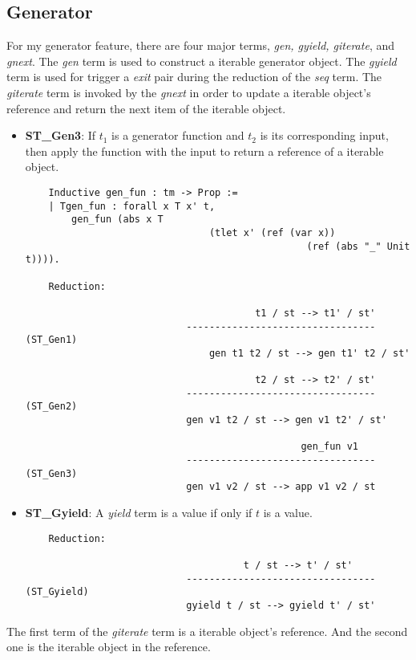 \subsection{Generator}
For my generator feature, there are four major terms, \textit{gen, gyield, giterate}, and \textit{gnext}. The \textit{gen} term is used to construct a iterable generator object. The \textit{gyield} term is used for trigger a \textit{exit} pair during the reduction of the \textit{seq} term. The \textit{giterate} term is invoked by the \textit{gnext} in order to update a iterable object's reference and return the next item of the iterable object.
\begin{itemize}
	\item 
	\textbf{ST_Gen3}: If $t_1$ is a generator function and $t_2$ is its corresponding input, then apply the function with the input to return a reference of a iterable object.
	\begin{lstlisting}
	Inductive gen_fun : tm -> Prop :=
	| Tgen_fun : forall x T x' t,
		gen_fun (abs x T 
								(tlet x' (ref (var x)) 
												 (ref (abs "_" Unit t)))).

	Reduction:

										t1 / st --> t1' / st'
							--------------------------------- (ST_Gen1)
								gen t1 t2 / st --> gen t1' t2 / st'

										t2 / st --> t2' / st'
							--------------------------------- (ST_Gen2)
							gen v1 t2 / st --> gen v1 t2' / st'
							
												gen_fun v1
							--------------------------------- (ST_Gen3)
							gen v1 v2 / st --> app v1 v2 / st
	\end{lstlisting}
\end{itemize}	
\begin{itemize}
	\item 
	\textbf{ST_Gyield}: A \textit{yield} term is a value if only if $t$ is a value.
	\begin{lstlisting}
	Reduction:

									  t / st --> t' / st'
							--------------------------------- (ST_Gyield)
						 	gyield t / st --> gyield t' / st'
	\end{lstlisting}
\end{itemize}
The first term of the \textit{giterate} term is a iterable object's reference. And the second one is the iterable object in the reference.

